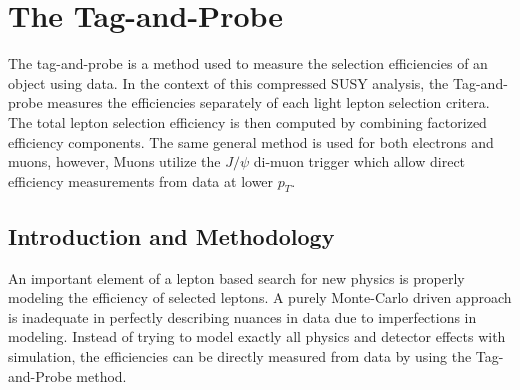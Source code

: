 \newcommand{\ID}{\text{ID}}
\newcommand{\Prompt}{\text{Prompt}}
\newcommand{\Isolated}{\text{Isolated}}
\newcommand{\Gold}{\text{Gold}}
\newcommand{\Silver}{\text{Silver}}
\newcommand{\Bronze}{\text{Bronze}}



\newcommand\FigureFour[6]{%
\begin{figure}[!htbp]%
\centering
\texttt{[image: fig/Lep\_Obj\_plots/\#1]}\hfill
\texttt{[image: fig/Lep\_Obj\_plots/\#2]}\hfill
\texttt{[image: fig/Lep\_Obj\_plots/\#3]}\hfill
\texttt{[image: fig/Lep\_Obj\_plots/\#4]}\hfill
\caption{#6}
\label{#5}
\end{figure}}

\setcounter{secnumdepth}{3}
\setcounter{tocdepth}{3}
\setlength{\parskip}{\smallskipamount}
\setlength{\parindent}{0pt}


\makeatletter


\providecommand{\tabularnewline}{\\}


\makeatother

%

\chapter{The Tag-and-Probe}

\begin{chapterabstract}
The tag-and-probe is a method used to measure the selection efficiencies of an object using data. In the context of this compressed SUSY analysis, the Tag-and-probe measures the efficiencies separately of each light lepton selection critera. The total lepton selection efficiency is then computed by combining factorized efficiency components. The same general method is used for both electrons and muons, however, Muons utilize  the $J/\psi$ di-muon trigger which allow direct efficiency measurements from data at lower $p_T$.
\end{chapterabstract}

\section{Introduction and Methodology}
An important element of a lepton based search for new physics is properly modeling the efficiency of selected leptons. A purely Monte-Carlo driven approach is inadequate in perfectly describing nuances in data due to imperfections in modeling. Instead of trying to model exactly all physics and detector effects with simulation, the efficiencies can be directly measured from data by using the Tag-and-Probe method. 

